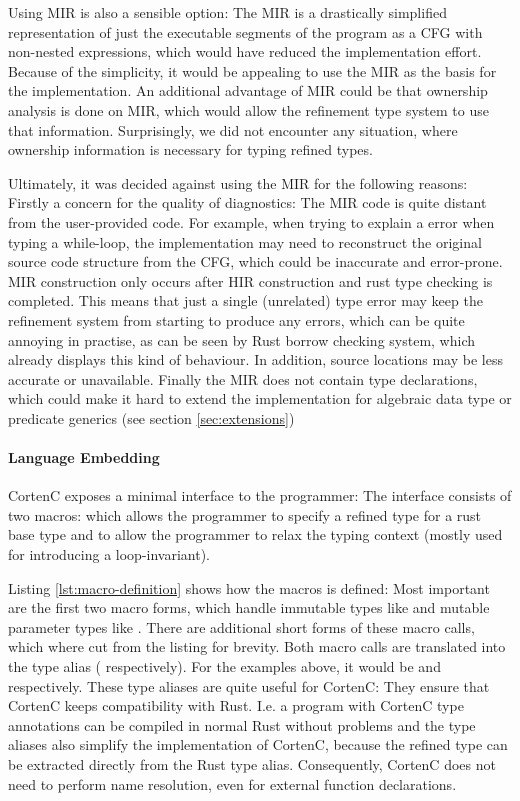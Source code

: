 \documentclass[twoside, english, final]{sdqthesis}
\theoremstyle{definition}
\begin{document}
Using MIR is also a sensible option: The MIR is a drastically simplified representation of just the executable segments of the program as a CFG with non-nested expressions, which would have reduced the implementation effort.
Because of the simplicity, it would be appealing to use the MIR as the basis for the implementation. 
An additional advantage of MIR could be that ownership analysis is done on MIR, which would allow the refinement type system to use that information. Surprisingly, we did not encounter any situation, where ownership information is necessary for typing refined types.

Ultimately, it was decided against using the MIR for the following reasons:
Firstly a concern for the quality of diagnostics: The MIR code is quite distant from the user-provided code. For example, when trying to explain a error when typing a while-loop, the implementation may need to reconstruct the original source code structure from the CFG, which could be inaccurate and error-prone. 
MIR construction only occurs after HIR construction and rust type checking is completed. This means that just a single (unrelated) type error may keep the refinement system from starting to produce any errors, which can be quite annoying in practise, as can be seen by Rust borrow checking system, which already displays this kind of behaviour.
In addition, source locations may be less accurate or unavailable. 
Finally the MIR does not contain type declarations, which could make it hard to extend the implementation for algebraic data type or predicate generics (see section \ref{sec:extensions})

\paragraph{Language Embedding}
CortenC exposes a minimal interface to the programmer: The interface consists of two macros:
 which allows the programmer to specify a refined type for a rust base type and
 to allow the programmer to relax the typing context (mostly used for introducing a loop-invariant). 

Listing \ref{lst:macro-definition} shows how the  macros is defined: Most important are the first two macro forms, which handle immutable types like  and mutable parameter types like . 
There are additional short forms of these macro calls, which where cut from the listing for brevity. Both macro calls are translated into the type alias  ( respectively). For the examples above, it would be  and  respectively. These type aliases are quite useful for CortenC: They ensure that CortenC keeps compatibility with Rust. I.e. a program with CortenC type annotations can be compiled in normal Rust without problems and the type aliases also simplify the implementation of CortenC, because the refined type can be extracted directly from the Rust type alias. Consequently, CortenC does not need to perform name resolution, even for external function declarations.
\end{document}
